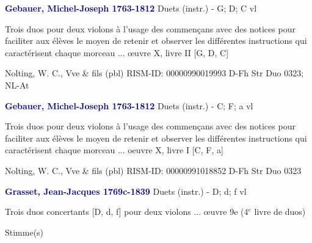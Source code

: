 \documentclass[twocolumn]{book}
\begin{document}
\newline \par \vspace{7pt} \textcolor{darkblue}{\textbf{Gebauer, Michel-Joseph  1763-1812}}
\newline Duets (instr.) - G; D; C
 vl
\newline \begin{itshape}Trois duos pour deux violons à l'usage des commençans avec des notices pour faciliter aux élèves le moyen de retenir et observer les différentes instructions qui caractérisent chaque morceau ... œuvre X, livre II [G, D, C]\end{itshape} 
\newline Nolting, W. C., Vve \& fils  (pbl)
\newline RISM-ID: 00000990019993
\newline D-Fh  Str Duo 0323; NL-At
\newline \par \vspace{7pt} \textcolor{darkblue}{\textbf{Gebauer, Michel-Joseph  1763-1812}}
\newline Duets (instr.) - C; F; a
 vl
\newline \begin{itshape}Trois duos pour deux violons à l'usage des commençans avec des notices pour faciliter aux élèves le moyen de retenir et observer les différentes instructions qui caractérisent chaque morceau ... oeuvre X, livre I [C, F, a]\end{itshape} 
\newline Nolting, W. C., Vve \& fils  (pbl)
\newline RISM-ID: 00000991018852
\newline D-Fh  Str Duo 0323
\newline \par \vspace{7pt} \textcolor{darkblue}{\textbf{Grasset, Jean-Jacques  1769c-1839}}
\newline Duets (instr.) - D; d; f
 vl
\newline \begin{itshape}Trois duos concertants [D, d, f] pour deux violons ... œuvre 9e (4$^e$ livre de duos)\end{itshape} 
\newline \textcolor{darkblue}{}  Stimme(s)
\end{document}
